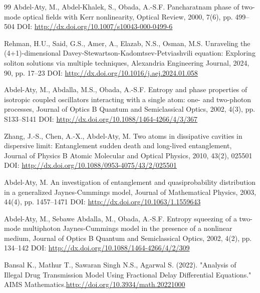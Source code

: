 \documentclass[10pt]{NSP1}
\begin{document}
\begin{thebibliography}{99}
 Abdel-Aty, M., Abdel-Khalek, S., Obada, A.-S.F. Pancharatnam phase of two-mode optical fields with Kerr nonlinearity, Optical Review, 2000, 7(6), pp. 499–504 DOI: \url{http://dx.doi.org/10.1007/s10043-000-0499-6}


 Rehman, H.U., Said, G.S., Amer, A., Elazab, N.S., Osman, M.S. Unraveling the (4+1)-dimensional Davey-Stewartson-Kadomtsev-Petviashvili equation: Exploring soliton solutions via multiple techniques, Alexandria Engineering Journal, 2024, 90, pp. 17--23 DOI: \url{http://dx.doi.org/10.1016/j.aej.2024.01.058}


 Abdel-Aty, M., Abdalla, M.S., Obada, A.-S.F. Entropy and phase properties of isotropic coupled oscillators interacting with a single atom: one- and two-photon processes, Journal of Optics B Quantum and Semiclassical Optics, 2002, 4(3), pp. S133–S141 DOI: \url{http://dx.doi.org/10.1088/1464-4266/4/3/367}

 Zhang, J.-S., Chen, A.-X., Abdel-Aty, M. Two atoms in dissipative cavities in dispersive limit: Entanglement sudden death and long-lived entanglement, Journal of Physics B Atomic Molecular and Optical Physics, 2010, 43(2), 025501 DOI: \url{http://dx.doi.org/10.1088/0953-4075/43/2/025501}

 Abdel-Aty, M.
An investigation of entanglement and quasiprobability distribution in a generalized Jaynes-Cummings model, Journal of Mathematical Physics, 2003, 44(4), pp. 1457–1471  DOI: \url{http://dx.doi.org/10.1063/1.1559643}

 Abdel-Aty, M., Sebawe Abdalla, M., Obada, A.-S.F. Entropy squeezing of a two-mode multiphoton Jaynes-Cummings model in the presence of a nonlinear medium, Journal of Optics B Quantum and Semiclassical Optics, 2002, 4(2), pp. 134–142  DOI: \url{http://dx.doi.org/10.1088/1464-4266/4/2/309}

 Bansal K., Mathur T., Sawaran Singh N.S., Agarwal S. (2022). "Analysis of Illegal Drug Transmission Model Using Fractional Delay Differential Equations." AIMS Mathematics.\url{http://doi.org/10.3934/math.20221000}





\end{thebibliography}
\end{document}
